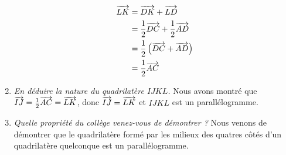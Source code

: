 \documentclass[12pt]{article}
\begin{document}
\begin{exercice}[Vecteurs]
\begin{enumerate}
\begin{multicols}{2}
      \begin{align*}
      \overrightarrow{LK} &= \overrightarrow{DK}+\overrightarrow{LD} \\
      &= \frac{1}{2}\overrightarrow{DC} + \frac{1}{2}\overrightarrow{AD}\\
      &= \frac{1}{2}\left( \overrightarrow{DC}+\overrightarrow{AD} \right)\\
      &=\frac{1}{2}\overrightarrow{AC}
      \end{align*}
    \end{multicols}
    \item \emph{En déduire la nature du quadrilatère $IJKL$.}
      Nous avons montré que $\overrightarrow{IJ}=\frac{1}{2}\overrightarrow{AC}=\overrightarrow{LK}$, donc $\overrightarrow{IJ}=\overrightarrow{LK}$ et $IJKL$ est un parallélogramme.
    \item \emph{Quelle propriété du collège venez-vous de démontrer ?} Nous venons de démontrer que le quadrilatère formé par les milieux des quatres côtés d'un quadrilatère quelconque est un parallélogramme.
  \end{enumerate}
  

\end{exercice}
\end{document}

